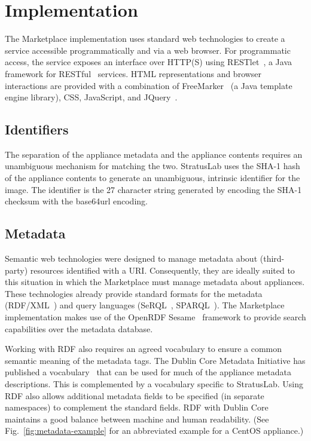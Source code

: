 \section{Implementation}
\label{sec:implementation}

The Marketplace implementation uses standard web technologies to
create a service accessible programmatically and via a web browser.
For programmatic access, the service exposes an interface over HTTP(S)
using RESTlet~\cite{restlet}, a Java framework for RESTful~\cite{rest}
services.  HTML representations and browser interactions are provided
with a combination of FreeMarker~\cite{freemarker} (a Java template
engine library), CSS, JavaScript, and JQuery~\cite{jquery}.

\subsection{Identifiers}

The separation of the appliance metadata and the appliance contents
requires an unambiguous mechanism for matching the two.  StratusLab
uses the SHA-1 hash of the appliance contents to generate an
unambiguous, intrinsic identifier for the image.  The identifier is
the 27 character string generated by encoding the SHA-1 checksum with
the base64url encoding.

\subsection{Metadata}



Semantic web technologies were designed to manage metadata about
(third-party) resources identified with a URI\@.  Consequently, they
are ideally suited to this situation in which the Marketplace must
manage metadata about appliances.  These technologies already provide
standard formats for the metadata (RDF/XML~\cite{rdfxml, rdfprimer,
  rdfschema}) and query languages (SeRQL~\cite{serql},
SPARQL~\cite{sparql}).  The Marketplace implementation makes use of
the OpenRDF Sesame~\cite{sesame} framework to provide search
capabilities over the metadata database.

Working with RDF also requires an agreed vocabulary to ensure a common
semantic meaning of the metadata tags.  The Dublin Core Metadata
Initiative has published a vocabulary~\cite{dcterms} that can be used
for much of the appliance metadata descriptions.  This is complemented
by a vocabulary specific to StratusLab\@.  Using RDF also allows
additional metadata fields to be specified (in separate namespaces) to
complement the standard fields. RDF with Dublin Core maintains a good
balance between machine and human readability. (See
Fig.~\ref{fig:metadata-example} for an abbreviated example for a
CentOS appliance.)

